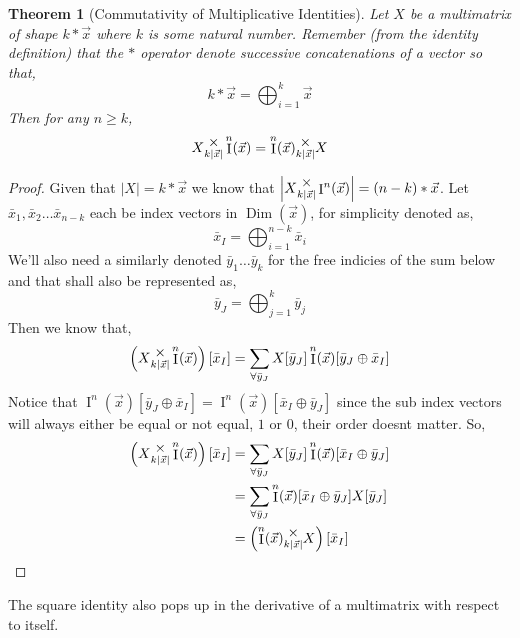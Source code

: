 \documentclass[12pt]{book}
\theoremstyle{plain}
\newtheorem{theorem}{Theorem}[chapter]
\theoremstyle{definition}
\theoremstyle{ppart}
\theoremstyle{case}
\theoremstyle{solution}
\DeclareMathOperator{\Dim}{Dim}
\DeclareMathOperator{\Ident}{I}
\newcommand{\mmult}[1]{\text{\raisebox{1ex}{$\underset{#1}{\times}$}}}
\newcommand{\shape}[1]{\left|#1\right|}
\begin{document}
\begin{theorem}[Commutativity of Multiplicative Identities]
\label{ident_commute}
Let $X$ be a multimatrix of shape $k * \vec{x}$ where $k$ is some natural number.
Remember (from the identity definition) that the $*$ operator denote successive concatenations of a vector so that,
\[ k * \vec{x} = \bigoplus_{i=1}^k \vec{x} \]
Then for any $n \ge k$,
\[ X \mmult{k \shape{\vec{x}}} \Ident^n(\vec{x}) = \Ident^n(\vec{x}) \mmult{k \shape{\vec{x}}} X \]
\end{theorem}
\begin{proof}
Given that $\shape{X} = k * \vec{x}$ we know that
$\shape{X \mmult{k \shape{\vec{x}}} \Ident^n(\vec{x})} = (n-k) * \vec{x}$.
Let $\bar{x}_1, \bar{x}_2 \ldots \bar{x}_{n-k}$ each be index vectors in $\Dim(\vec{x})$,
for simplicity denoted as,
\[ \bar{x}_I = \bigoplus_{i=1}^{n-k} \bar{x}_i \]
We'll also need a similarly denoted $\bar{y}_1 \ldots \bar{y}_k$ for the free indicies of
the sum below and that shall also be represented as,
\[ \bar{y}_J = \bigoplus_{j=1}^{k} \bar{y}_j \]
Then we know that,
\[
  \left(X \mmult{k \shape{\vec{x}}} \Ident^n(\vec{x}) \right)[\bar{x}_I]
  = \sum_{\forall \bar{y}_J} X[\bar{y}_J] \Ident^n(\vec{x})[\bar{y}_J \oplus \bar{x}_I]
\]
Notice that $\Ident^n(\vec{x})[\bar{y}_J \oplus \bar{x}_I] = \Ident^n(\vec{x})[\bar{x}_I \oplus \bar{y}_J]$
since the sub index vectors will always either be equal or not equal, $1$ or $0$, their order doesnt matter.
So,
\begin{align*}
  \left(X \mmult{k \shape{\vec{x}}} \Ident^n(\vec{x}) \right)[\bar{x}_I]
  &= \sum_{\forall \bar{y}_J} X[\bar{y}_J] \Ident^n(\vec{x})[\bar{x}_I \oplus \bar{y}_J] \\
  &= \sum_{\forall \bar{y}_J} \Ident^n(\vec{x})[\bar{x}_I \oplus \bar{y}_J] X[\bar{y}_J] \\
  &= \left(\Ident^n(\vec{x}) \mmult{k \shape{\vec{x}}} X \right)[\bar{x}_I]
\end{align*}
\end{proof}

The square identity also pops up in the derivative of a multimatrix
with respect to itself.
\end{document}
